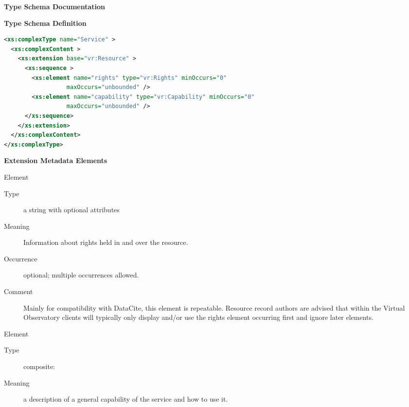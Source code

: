 \documentclass[11pt,a4paper]{ivoa}
\begin{document}
\begin{generated}
\begingroup
        \renewcommand*\descriptionlabel[1]{%
        \hbox to 5.5em{\emph{#1}\hfil}}\vspace{2ex}\noindent\textbf{ Type Schema Documentation}


\vspace{1ex}\noindent\textbf{ Type Schema Definition}

\begin{lstlisting}[language=XML,basicstyle=\footnotesize]
<xs:complexType name="Service" >
  <xs:complexContent >
    <xs:extension base="vr:Resource" >
      <xs:sequence >
        <xs:element name="rights" type="vr:Rights" minOccurs="0"
                  maxOccurs="unbounded" />
        <xs:element name="capability" type="vr:Capability" minOccurs="0"
                  maxOccurs="unbounded" />
      </xs:sequence>
    </xs:extension>
  </xs:complexContent>
</xs:complexType>
\end{lstlisting}

\vspace{0.5ex}\noindent\textbf{ Extension Metadata Elements}

\begingroup\small\begin{bigdescription}\item[Element \xmlel{rights}]
\begin{description}
\item[Type] a string with optional attributes
\item[Meaning]
                       Information about rights held in and over the resource.

\item[Occurrence] optional; multiple occurrences allowed.
\item[Comment]
                       Mainly for compatibility with DataCite, this element
                       is repeatable.  Resource record authors are advised
                       that within the Virtual Observatory clients will
                       typically only display and/or use the rights
                       element occurring first and ignore later elements.


\end{description}
\item[Element \xmlel{capability}]
\begin{description}
\item[Type] composite: 
\item[Meaning]
                        a description of a general capability of the
                        service and how to use it.


\end{description}
\end{bigdescription}
\end{generated}
\end{document}
